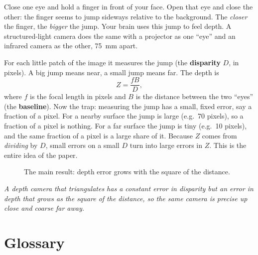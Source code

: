 \documentclass[11pt,a4paper]{article}
\begin{document}
Close one eye and hold a finger in front of your face. Open that eye and close the other: the
finger seems to jump sideways relative to the background. The \emph{closer} the finger, the
\emph{bigger} the jump. Your brain uses this jump to feel depth. A structured-light camera does
the same with a projector as one ``eye'' and an infrared camera as the other, 75~mm apart.

For each little patch of the image it measures the jump (the \textbf{disparity} $D$, in pixels).
A big jump means near, a small jump means far. The depth is
\[
Z=\frac{fB}{D},
\]
where $f$ is the focal length in pixels and $B$ is the distance between the two ``eyes'' (the
\textbf{baseline}). Now the trap: measuring the jump has a small, fixed error, say a fraction of
a pixel. For a nearby surface the jump is large (e.g.\ 70 pixels), so a fraction of a pixel is
nothing. For a far surface the jump is tiny (e.g.\ 10 pixels), and the same fraction of a pixel is
a large share of it. Because $Z$ comes from \emph{dividing} by $D$, small errors on a small $D$
turn into large errors in $Z$. This is the entire idea of the paper.

\begin{figure}[H]
\centering
{}
\caption{The main result: depth error grows with the square of the distance.}
\end{figure}

\begin{idea}
\emph{A depth camera that triangulates has a constant error in disparity but an error in depth
that grows as the square of the distance, so the same camera is precise up close and coarse far
away.}
\end{idea}

\section{Glossary}
\end{document}

